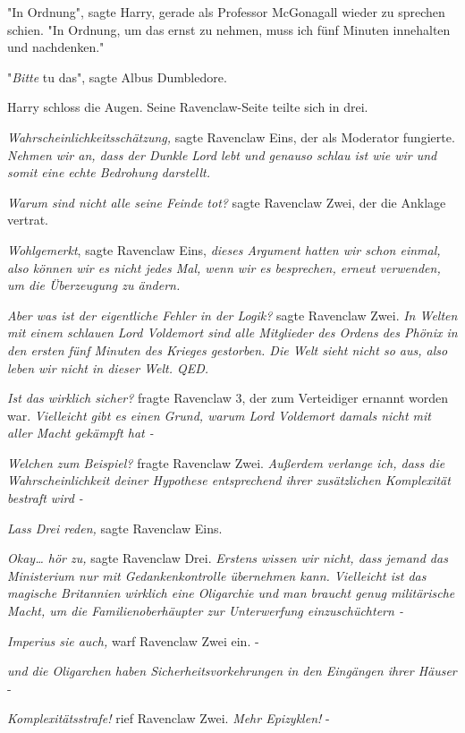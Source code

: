 {"In Ordnung", sagte Harry, gerade als Professor McGonagall wieder zu sprechen schien. "In Ordnung, um das ernst zu nehmen, muss ich fünf Minuten innehalten und nachdenken."

"\emph{Bitte} tu das", sagte Albus Dumbledore.

Harry schloss die Augen. Seine Ravenclaw-Seite teilte sich in drei.

\emph{Wahrscheinlichkeitsschätzung,} sagte Ravenclaw Eins, der als Moderator fungierte. \emph{Nehmen wir an, dass der Dunkle Lord lebt und genauso schlau ist wie wir und somit eine echte Bedrohung darstellt.}

\emph{Warum sind nicht alle seine Feinde tot?} sagte Ravenclaw Zwei, der die Anklage vertrat.

\emph{Wohlgemerkt}, sagte Ravenclaw Eins, \emph{dieses Argument hatten wir schon einmal, also können wir es nicht jedes Mal, wenn wir es besprechen, erneut verwenden, um die Überzeugung zu ändern.}

\emph{Aber was ist der eigentliche Fehler in der Logik?} sagte Ravenclaw Zwei. \emph{In Welten mit einem schlauen Lord Voldemort sind alle Mitglieder des Ordens des Phönix in den ersten fünf Minuten des Krieges gestorben. Die Welt sieht nicht so aus, also leben wir nicht in dieser Welt. QED.}

\emph{Ist das wirklich sicher?} fragte Ravenclaw 3, der zum Verteidiger ernannt worden war. \emph{Vielleicht gibt es einen Grund, warum Lord Voldemort damals nicht mit aller Macht gekämpft hat -}

\emph{Welchen zum Beispiel?} fragte Ravenclaw Zwei. \emph{Außerdem verlange ich, dass die Wahrscheinlichkeit deiner Hypothese entsprechend ihrer zusätzlichen Komplexität bestraft wird -}

\emph{Lass Drei reden,} sagte Ravenclaw Eins.

\emph{Okay… hör zu,} sagte Ravenclaw Drei. \emph{Erstens wissen wir nicht, dass jemand das Ministerium nur mit Gedankenkontrolle übernehmen kann. Vielleicht ist das magische Britannien wirklich eine Oligarchie und man braucht genug militärische Macht, um die Familienoberhäupter zur Unterwerfung einzuschüchtern -}

\emph{Imperius sie auch,} warf Ravenclaw Zwei ein. -

\emph{und die Oligarchen haben Sicherheitsvorkehrungen in den Eingängen ihrer Häuser} -

\emph{Komplexitätsstrafe!} rief Ravenclaw Zwei. \emph{Mehr Epizyklen!} -

}
